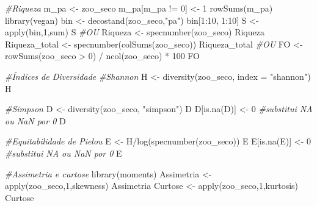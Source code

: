 \documentclass[
  letterpaper,
  DIV=11,
  numbers=noendperiod]{scrartcl}
\newenvironment{Shaded}{}{}
\newcommand{\AttributeTok}[1]{\textcolor[rgb]{0.49,0.56,0.16}{#1}}
\newcommand{\CommentTok}[1]{\textcolor[rgb]{0.38,0.63,0.69}{\textit{#1}}}
\newcommand{\DecValTok}[1]{\textcolor[rgb]{0.25,0.63,0.44}{#1}}
\newcommand{\FunctionTok}[1]{\textcolor[rgb]{0.02,0.16,0.49}{#1}}
\newcommand{\NormalTok}[1]{#1}
\newcommand{\OtherTok}[1]{\textcolor[rgb]{0.00,0.44,0.13}{#1}}
\newcommand{\SpecialCharTok}[1]{\textcolor[rgb]{0.25,0.44,0.63}{#1}}
\newcommand{\StringTok}[1]{\textcolor[rgb]{0.25,0.44,0.63}{#1}}
\begin{document}
\begin{Shaded}
\begin{Highlighting}[numbers=left,,]
\CommentTok{\#Riqueza}
\NormalTok{m\_pa }\OtherTok{\textless{}{-}}\NormalTok{ zoo\_seco}
\NormalTok{m\_pa[m\_pa }\SpecialCharTok{!=} \DecValTok{0}\NormalTok{] }\OtherTok{\textless{}{-}} \DecValTok{1}
\FunctionTok{rowSums}\NormalTok{(m\_pa)}
\FunctionTok{library}\NormalTok{(vegan)}
\NormalTok{bin }\OtherTok{\textless{}{-}} \FunctionTok{decostand}\NormalTok{(zoo\_seco,}\StringTok{"pa"}\NormalTok{)}
\NormalTok{bin[}\DecValTok{1}\SpecialCharTok{:}\DecValTok{10}\NormalTok{, }\DecValTok{1}\SpecialCharTok{:}\DecValTok{10}\NormalTok{]}
\NormalTok{S }\OtherTok{\textless{}{-}} \FunctionTok{apply}\NormalTok{(bin,}\DecValTok{1}\NormalTok{,sum)}
\NormalTok{S}
\CommentTok{\#OU}
\NormalTok{Riqueza }\OtherTok{\textless{}{-}} \FunctionTok{specnumber}\NormalTok{(zoo\_seco)}
\NormalTok{Riqueza}
\NormalTok{Riqueza\_total }\OtherTok{\textless{}{-}} \FunctionTok{specnumber}\NormalTok{(}\FunctionTok{colSums}\NormalTok{(zoo\_seco))}
\NormalTok{Riqueza\_total}
\CommentTok{\#OU}
\NormalTok{FO }\OtherTok{\textless{}{-}} \FunctionTok{rowSums}\NormalTok{(zoo\_seco }\SpecialCharTok{\textgreater{}} \DecValTok{0}\NormalTok{) }\SpecialCharTok{/} \FunctionTok{ncol}\NormalTok{(zoo\_seco) }\SpecialCharTok{*} \DecValTok{100}
\NormalTok{FO}

\CommentTok{\#Índices de Diversidade}
\CommentTok{\#Shannon}
\NormalTok{H }\OtherTok{\textless{}{-}} \FunctionTok{diversity}\NormalTok{(zoo\_seco, }\AttributeTok{index =} \StringTok{"shannon"}\NormalTok{)}
\NormalTok{H}

\CommentTok{\#Simpson}
\NormalTok{D }\OtherTok{\textless{}{-}} \FunctionTok{diversity}\NormalTok{(zoo\_seco, }\StringTok{"simpson"}\NormalTok{)}
\NormalTok{D}
\NormalTok{D[}\FunctionTok{is.na}\NormalTok{(D)] }\OtherTok{\textless{}{-}} \DecValTok{0} \CommentTok{\#substitui NA ou NaN por 0}
\NormalTok{D}

\CommentTok{\#Equitabilidade de Pielou}
\NormalTok{E }\OtherTok{\textless{}{-}}\NormalTok{ H}\SpecialCharTok{/}\FunctionTok{log}\NormalTok{(}\FunctionTok{specnumber}\NormalTok{(zoo\_seco))}
\NormalTok{E}
\NormalTok{E[}\FunctionTok{is.na}\NormalTok{(E)] }\OtherTok{\textless{}{-}} \DecValTok{0} \CommentTok{\#substitui NA ou NaN por 0}
\NormalTok{E}

\CommentTok{\#Assimetria e curtose}
\FunctionTok{library}\NormalTok{(moments)}
\NormalTok{Assimetria }\OtherTok{\textless{}{-}} \FunctionTok{apply}\NormalTok{(zoo\_seco,}\DecValTok{1}\NormalTok{,skewness)}
\NormalTok{Assimetria}
\NormalTok{Curtose }\OtherTok{\textless{}{-}} \FunctionTok{apply}\NormalTok{(zoo\_seco,}\DecValTok{1}\NormalTok{,kurtosis)}
\NormalTok{Curtose}


\end{Highlighting}
\end{Shaded}
\end{document}
